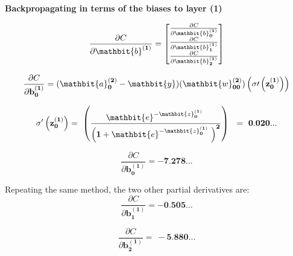 \documentclass[12pt,a4paper]{article}
\begin{document}
\hspace{}

\textbf{Backpropagating in terms of the biases to layer (1)}

\begin{equation}
\frac{\partial C}{\partial\mathbit{b}^{\left(\mathbf{1}\right)}}=\left[\begin{matrix}\frac{\partial C}{\partial\mathbit{b}_\mathbf{0}^{\left(\mathbf{1}\right)}}\\\frac{\partial C}{\partial\mathbit{b}_\mathbf{1}^{\left(\mathbf{1}\right)}}\\\frac{\partial C}{\partial\mathbit{b}_\mathbf{2}^{\left(\mathbf{1}\right)}}\\\end{matrix}\right]
\end{equation}


\begin{equation}
	\frac{\partial C}{\partial\mathbf{b}_\mathbf{0}^{\left(\mathbf{1}\right)}}={(\mathbit{a}}_\mathbf{0}^{\left(\mathbf{2}\right)}-\mathbit{y})(\mathbit{w}_{\mathbf{00}}^{\left(\mathbf{2}\right)})\left(\mathbf{\sigma}\prime\left(\mathbf{z}_\mathbf{0}^{\left(\mathbf{1}\right)}\right)\right)
\end{equation}


\begin{equation}
    \mathbf{\sigma}^\prime\left(\mathbf{z}_\mathbf{0}^{\left(\mathbf{1}\right)}\right)=\ \left(\frac{\mathbit{e}^{-\mathbit{z}_\mathbf{0}^{\left(\mathbf{1}\right)}\ }}{\left(\mathbf{1}+\mathbit{e}^{-\mathbit{z}_\mathbf{0}^{\left(\mathbf{1}\right)}\ }\right)^\mathbf{2}}\right)\ \ =\ \mathbf{0}.\mathbf{020}...
\end{equation}

\begin{equation}
\frac{\partial C}{\partial\mathbf{b}_\mathbf{0}^{\left(\mathbf{1}\right)}}=-\mathbf{7}.\mathbf{278}...	
\end{equation}


Repeating the same method, the two other partial derivatives are:
\begin{equation}
\frac{\partial C}{\partial\mathbf{b}_\mathbf{1}^{\left(\mathbf{1}\right)}}=-\mathbf{0}.\mathbf{505}\ldots
\end{equation}

\begin{equation}
\frac{\partial C}{\partial\mathbf{b}_\mathbf{2}^{\left(\mathbf{1}\right)}}=\ -\mathbf{5}.\mathbf{880}...
\end{equation}
\end{document}
